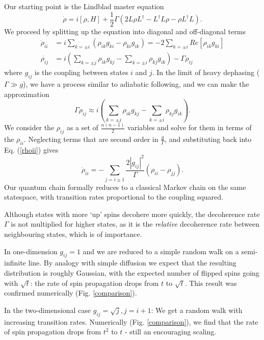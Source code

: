     Our starting point is the Lindblad master equation
    \begin{equation}
    \dot{\rho}=i\left[\rho,H\right]+\frac{1}{2}\Gamma\left(2L\rho
        L^{\dagger}-L^{\dagger}L\rho-\rho L^{\dagger}L\right).
    \end{equation}
    We proceed by splitting up the equation into diagonal and off-diagonal terms
    \begin{align}
    \dot{\rho}_{ii} & = i\sum_{k=\pm i}\left(\rho_{ik}g_{ki}-\rho_{ki}g_{ik}\right)=-2\sum_{k=\pm
      i}Re\left[\rho_{ik}g_{ki}\right] \label{rhoii}\\
        \dot{\rho_{ij}} & = i\left(\sum_{k=\pm j}\rho_{ik}g_{kj}-\sum_{k=\pm
            i}\rho_{kj}g_{ik}\right)-\Gamma\rho_{ij}
        \end{align}
        where $g_{ij}$ is the coupling between states $i$ and $j$. In the limit of heavy dephasing ($\Gamma\gg g$), we have a process similar to adiabatic following, and we can make the approximation\[ \Gamma\rho_{ij}\approx i\left(\sum_{k=\pm j}\rho_{ik}g_{kj}-\sum_{k=\pm i}\rho_{kj}g_{ik}\right).\] We consider the $\rho_{ij}$ as a set of $\frac{n(n-1)}{2}$ variables and solve for them in terms of the $\rho_{ii}$. Neglecting terms that are second order in $\frac{g}{\Gamma}$, and substituting back into Eq. (\ref{rhoii}) gives \[ \dot{\rho}_{ii}=-\sum_{j=i\pm1}\frac{2|g_{ij}|^{2}}{\Gamma}\left(\rho_{ii}-\rho_{jj}\right).\]
Our quantum chain formally reduces to a classical Markov chain on the same statespace, with transition rates proportional to the coupling squared.

Although states with more `up' spins decohere more quickly, the decoherence rate $\Gamma$ is not multiplied for higher states, as it is the \textit{relative} decoherence rate between neighbouring states, which is of importance.

In one-dimension $g_{ij} = 1$ and we are reduced to a simple random walk on a semi-infinite line. By analogy with simple diffusion we expect that the resulting distribution is roughly Gaussian, with the expected number of flipped spins going with $\sqrt{t}$: the rate of spin propagation drops from $t$ to $\sqrt{t}$. This result was confirmed numerically (Fig. \ref{comparison}).

        In the two-dimensional case $g_{ij} = \sqrt{j}, j=i+1$: We get a random walk with increasing transition rates. Numerically (Fig. \ref{comparison}), we find that the rate of spin propagation drops from $t^2$ to $t$ - still an encouraging scaling.

